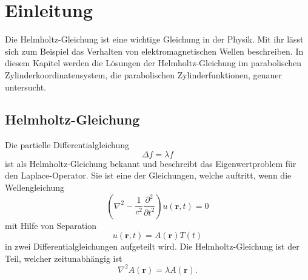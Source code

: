 %
%
%
\section{Einleitung\label{parzyl:section:teil0}}
Die Helmholtz-Gleichung ist eine wichtige Gleichung in der Physik. 
Mit ihr lässt sich zum Beispiel das Verhalten von elektromagnetischen Wellen beschreiben.
In diesem Kapitel werden die Lösungen der Helmholtz-Gleichung im parabolischen Zylinderkoordinatensystem, 
die parabolischen Zylinderfunktionen, genauer untersucht.

\subsection{Helmholtz-Gleichung}
Die partielle Differentialgleichung 
\begin{equation}
	\Delta f = \lambda f
\end{equation}
ist als Helmholtz-Gleichung bekannt und beschreibt das Eigenwertproblem für den Laplace-Operator. 
Sie ist eine der Gleichungen, welche auftritt, wenn die Wellengleichung
\begin{equation}
	\left ( \nabla^2 - \frac{1}{c^2}\frac{\partial^2}{\partial t^2}  \right ) u(\textbf{r},t)
	=
	0 
\end{equation}
mit Hilfe von Separation
\begin{equation}
	u(\textbf{r},t) = A(\textbf{r})T(t)
\end{equation} 
in zwei Differentialgleichungen aufgeteilt wird. Die Helmholtz-Gleichung ist der Teil, 
welcher zeitunabhängig ist
\begin{equation}
	\nabla^2 A(\textbf{r}) = \lambda A(\textbf{r}).
\end{equation}

